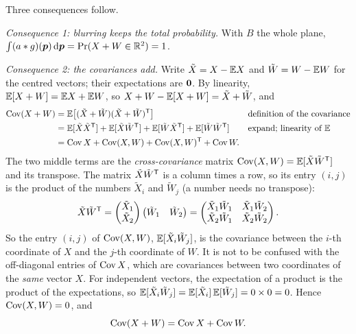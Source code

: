 Three consequences follow.

\emph{Consequence 1: blurring keeps the total probability.} With $B$ the
whole plane, $\int(a\ast g)(\bm{p})\,\mathrm d\bm{p}=\Pr(X+W\in\mathbb{R}^2)=1$.

\emph{Consequence 2: the covariances add.} Write $\tilde X=X-\mathbb{E} X$ and
$\tilde W=W-\mathbb{E} W$ for the centred vectors; their expectations are $\bm{0}$.
By linearity, $\mathbb{E}[X+W]=\mathbb{E} X+\mathbb{E} W$, so $X+W-\mathbb{E}[X+W]=\tilde X+\tilde W$, and
\begin{align*}
  \operatorname{Cov}(X+W)
  &=\mathbb{E}\bigl[(\tilde X+\tilde W)(\tilde X+\tilde W)^{\mathsf{T}}\bigr]
  &&\text{definition of the covariance}\\
  &=\mathbb{E}[\tilde X\tilde X^{\mathsf{T}}]+\mathbb{E}[\tilde X\tilde W^{\mathsf{T}}]
    +\mathbb{E}[\tilde W\tilde X^{\mathsf{T}}]+\mathbb{E}[\tilde W\tilde W^{\mathsf{T}}]
  &&\text{expand; linearity of }\mathbb{E}\\
  &=\operatorname{Cov} X+\operatorname{Cov}(X,W)+\operatorname{Cov}(X,W)^{\mathsf{T}}+\operatorname{Cov} W .
\end{align*}
The two middle terms are the \emph{cross-covariance} matrix
$\operatorname{Cov}(X,W)=\mathbb{E}[\tilde X\tilde W^{\mathsf{T}}]$ and its transpose. The matrix
$\tilde X\tilde W^{\mathsf{T}}$ is a column times a row, so its entry $(i,j)$ is the
product of the numbers $\tilde X_i$ and $\tilde W_j$ (a number needs no
transpose):
\[
  \tilde X\tilde W^{\mathsf{T}}=
  \begin{pmatrix}\tilde X_1\\ \tilde X_2\end{pmatrix}
  \begin{pmatrix}\tilde W_1&\tilde W_2\end{pmatrix}
  =\begin{pmatrix}\tilde X_1\tilde W_1&\tilde X_1\tilde W_2\\
   \tilde X_2\tilde W_1&\tilde X_2\tilde W_2\end{pmatrix}.
\]
So the entry $(i,j)$ of $\operatorname{Cov}(X,W)$, $\mathbb{E}[\tilde X_i\tilde W_j]$, is the
covariance between the $i$-th
coordinate of $X$ and the $j$-th coordinate of $W$. It is not to be
confused with the off-diagonal entries of $\operatorname{Cov} X$, which are covariances
between two coordinates of the \emph{same} vector $X$. For independent
vectors, the expectation of a product is the product of the
expectations, so $\mathbb{E}[\tilde X_i\tilde W_j]=\mathbb{E}[\tilde X_i]\,\mathbb{E}[\tilde
W_j]=0\times0=0$. Hence $\operatorname{Cov}(X,W)=0$, and
\[
  \operatorname{Cov}(X+W)=\operatorname{Cov} X+\operatorname{Cov} W .
\]


